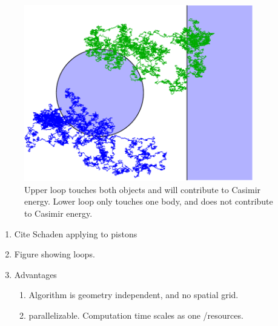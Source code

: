 \begin{figure}
\center
\includegraphics[width=10cm]{fig/intro/hit_strong_coupling}
\caption{Upper loop touches both objects and will contribute to Casimir energy.  Lower loop only touches one body, and does not contribute to Casimir energy.}
\end{figure}


\begin{enumerate}
\item Cite Schaden applying to pistons\cite{Schaden2009}
\item Figure showing loops.  
\item Advantages
  \begin{enumerate}
  \item Algorithm is geometry independent, and no spatial grid.
  \item parallelizable.  Computation time scales as one /resources.  
  \end{enumerate}

\end{enumerate}



